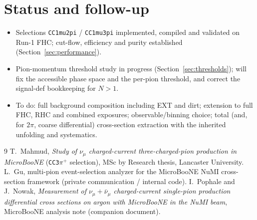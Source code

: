 \documentclass[11pt,a4paper]{article}
\newcommand{\uboone}{MicroBooNE}
\begin{document}
\section{Status and follow-up}
\label{sec:status}

\begin{itemize}[nosep]
  \item Selections \texttt{CC1mu2pi} / \texttt{CC1mu3pi} implemented, compiled and
        validated on Run-1 FHC; cut-flow, efficiency and purity established
        (Section~\ref{sec:performance}).
  \item Pion-momentum threshold study in progress (Section~\ref{sec:thresholds}); will fix
        the accessible phase space and the per-pion threshold, and correct the signal-def
        bookkeeping for $N>1$.
  \item To do: full background composition including EXT and dirt; extension to full FHC,
        RHC and combined exposures; observable/binning choice; total (and, for $2\pi$,
        coarse differential) cross-section extraction with the inherited unfolding and
        systematics.
\end{itemize}

\begin{thebibliography}{9}
 T.\ Mahmud, \textit{Study of $\nu_\mu$ charged-current three-charged-pion
  production in \uboone{}} (\texttt{CC3}$\pi^+$ selection), MSc by Research thesis,
  Lancaster University.
 L.\ Gu, multi-pion event-selection analyzer for the \uboone{} NuMI
  cross-section framework (private communication / internal code).
 I.\ Pophale and J.\ Nowak, \textit{Measurement of
  $\nu_\mu+\bar\nu_\mu$ charged-current single-pion production differential cross sections
  on argon with \uboone{} in the NuMI beam}, \uboone{} analysis note (companion document).
\end{thebibliography}
\end{document}
